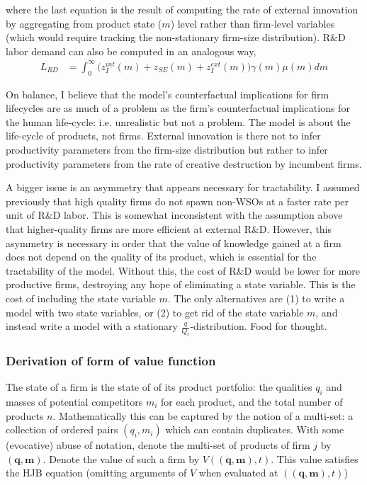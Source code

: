 \documentclass[12pt,english]{article}
\theoremstyle{remark}
\begin{document}
where the last equation is the result of computing the rate of external innovation by aggregating from product state ($m$) level rather than firm-level variables (which would require tracking the non-stationary firm-size distribution). R\&D labor demand can also be computed in an analogous way,
\begin{align*}
L_{RD} &= \int_0^{\infty} \Big( z_I^{int}(m) + z_{SE}(m) + z_I^{ext}(m) \Big) \gamma(m) \mu(m) dm
\end{align*}

On balance, I believe that the model's counterfactual implications for firm lifecycles are as much of a problem as the firm's counterfactual implications for the human life-cycle: i.e. unrealistic but not a problem. The model is about the life-cycle of products, not firms. External innovation is there not to infer productivity parameters from the firm-size distribution but rather to infer productivity parameters from the rate of creative destruction by incumbent firms. 

A bigger issue is an asymmetry that appears necessary for tractability. I assumed previously that high quality firms do not spawn non-WSOs at a faster rate per unit of R\&D labor. This is somewhat inconsistent with the assumption above that higher-quality firms are more efficient at external R\&D. However, this asymmetry is necessary in order that the value of knowledge gained at a firm does not depend on the quality of its product, which is essential for the tractability of the model. Without this, the cost of R\&D would be lower for more productive firms, destroying any hope of eliminating a state variable. This is the cost of including the state variable $m$. The only alternatives are (1) to write a model with two state variables, or (2) to get rid of the state variable $m$, and instead write a model with a stationary $\frac{q}{Q_t}$-distribution. Food for thought.


\subsubsection{Derivation of form of value function}

The state of a firm is the state of of its product portfolio: the qualities $q_i$ and masses of potential competitors $m_i$ for each product, and the total number of products $n$. Mathematically this can be captured by the notion of a multi-set: a collection of ordered pairs $(q_i,m_i)$ which can contain duplicates. With some (evocative) abuse of notation, denote the multi-set of products of firm $j$ by $(\mathbf{q},\mathbf{m})$. Denote the value of such a firm by $V((\mathbf{q},\mathbf{m}),t)$. This value satisfies the HJB equation (omitting arguments of $V$ when evaluated at $(\mathbf{(q,m)},t)$)
\end{document}
